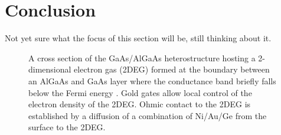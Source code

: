\section{Conclusion}
\label{sec:conclusion}

Not yet sure what the focus of this section will be, still thinking about it. 


\begin{figure}[h]
\centering
{}
\caption{ A cross section of the GaAs/AlGaAs heterostructure hosting a 2-dimensional electron gas (2DEG) formed at the boundary between an AlGaAs and GaAs layer where the conductance band briefly falls below the Fermi energy \cite{Baer}. Gold gates allow local control of the electron density of the 2DEG. Ohmic contact to the 2DEG is established by a diffusion of a combination of Ni/Au/Ge from the surface to the 2DEG.}

\label{fig:algaas}       %
\end{figure}

\endinput

Any text after an \endinput is ignored.
You could put scraps here or things in progress.
